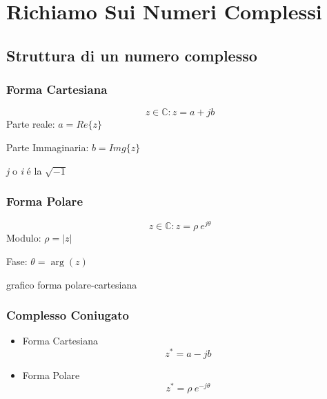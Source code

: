 \section{Richiamo Sui Numeri Complessi}
\subsection{Struttura di un numero complesso}

    \subsubsection{Forma Cartesiana}
            \begin{center}
                \[
                  z \in \mathbb{C} : z = a + jb
                \]
                Parte reale: $a=Re\{z\}$


                \vspace{0.1cm}
                Parte Immaginaria: $b=Img\{z\}$

                \vspace{0.1cm}
                {\em j} o {\em i} é la $\sqrt{-1}$  
            \end{center}
            
    \subsubsection{Forma Polare}
        \begin{center}
            \[
                z \in \mathbb{C} : z = \rho \ e^{j\theta}
            \]
            Modulo: $\rho = |z|$


            \vspace{0.1cm}
            Fase: $\theta = \arg(z)$
        \end{center}    
        grafico forma polare-cartesiana
        
    \subsubsection{Complesso Coniugato}
        \begin{itemize}
            \item {Forma Cartesiana   
                    \[
                        z^* = a - jb
                    \]
            }
            \item {Forma Polare
                    \[
                        z^* = \rho \ e^{-j\theta}
                    \]
            }           
        \end{itemize}


